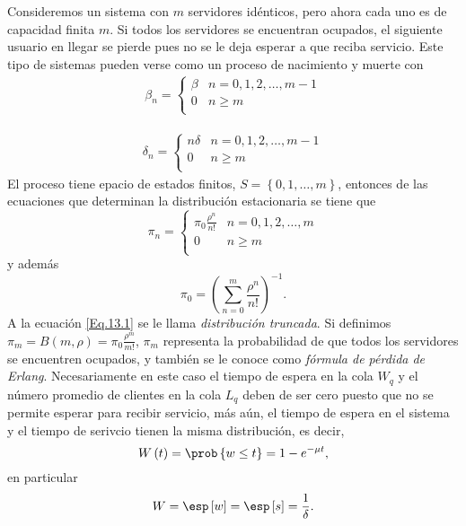 Consideremos un sistema con $m$ servidores id\'enticos, pero ahora cada uno es de capacidad finita $m$. Si todos los servidores se encuentran ocupados, el siguiente usuario en llegar se pierde pues no se le deja esperar a que reciba servicio. Este tipo de sistemas pueden verse como un proceso de nacimiento y muerte con
\begin{eqnarray}
\beta_{n}=\left\{\begin{array}{cc}
\beta & n=0,1,2,\ldots,m-1\\
0 & n\geq m\\
\end{array}
\right.
\end{eqnarray}

\begin{eqnarray}
\delta_{n}=\left\{\begin{array}{cc}
n\delta & n=0,1,2,\ldots,m-1\\
0 & n\geq m\\
\end{array}
\right.
\end{eqnarray}
El proceso tiene epacio de estados finitos, $S=\left\{0,1,\ldots,m\right\}$, entonces de las ecuaciones que determinan la distribuci\'on estacionaria se tiene que
\begin{equation}\label{Eq.13.1}
\pi_{n}=\left\{\begin{array}{cc}
\pi_{0}\frac{\rho^{n}}{n!} & n=0,1,2,\ldots,m\\
0 & n\geq m\\
\end{array}
\right.
\end{equation}
y adem\'as
\begin{equation}
\pi_{0}=\left(\sum_{n=0}^{m}\frac{\rho^{n}}{n!}\right)^{-1}.
\end{equation}
A la ecuaci\'on \ref{Eq.13.1} se le llama {\em distribuci\'on truncada}. Si definimos
$\pi_{m}=B\left(m,\rho\right)=\pi_{0}\frac{\rho^{m}}{m!}$, $\pi_{m}$ representa la probabilidad de que todos los servidores se encuentren ocupados, y tambi\'en se le conoce como {\em f\'ormula de p\'erdida de Erlang}. Necesariamente en este caso el tiempo de espera en la cola $W_{q}$ y el n\'umero promedio de clientes en la cola $L_{q}$ deben de ser cero puesto que no se permite esperar para recibir servicio, m\'as a\'un, el tiempo de espera en el sistema y el tiempo de serivcio tienen la misma distribuci\'on, es decir,
\[W\left(t\right)=\prob\left\{w\leq t\right\}=1-e^{-\mu t},\] en particular
\[W=\esp\left[w\right]=\esp\left[s\right]=\frac{1}{\delta}.\]
